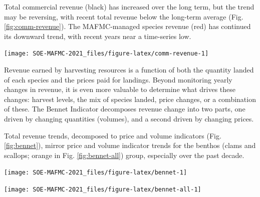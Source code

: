 \documentclass[
  10pt,
]{article}
\let\origfigure\figure
\let\endorigfigure\endfigure
\renewenvironment{figure}[1][2] {
    \expandafter\origfigure\expandafter[H]
} {
    \endorigfigure
}
\begin{document}
Total commercial revenue (black) has increased over the long term, but
the trend may be reversing, with recent total revenue below the
long-term average (Fig. \ref{fig:comm-revenue}). The MAFMC-managed
species revenue (red) has continued its downward trend, with recent
years near a time-series low.

\begin{figure}

{\centering \texttt{[image: SOE-MAFMC-2021\_files/figure-latex/comm-revenue-1]} 

}

\caption{Total revenue for the region (black) and revenue from MAFMC managed species (red).}\label{fig:comm-revenue}
\end{figure}

Revenue earned by harvesting resources is a function of both the
quantity landed of each species and the prices paid for landings. Beyond
monitoring yearly changes in revenue, it is even more valuable to
determine what drives these changes: harvest levels, the mix of species
landed, price changes, or a combination of these. The Bennet Indicator
decomposes revenue change into two parts, one driven by changing
quantities (volumes), and a second driven by changing prices.

Total revenue trends, decomposed to price and volume indicators (Fig.
\ref{fig:bennet}), mirror price and volume indicator trends for the
benthos (clams and scallops; orange in Fig. \ref{fig:bennet-all}) group,
especially over the past decade.

\begin{figure}

{\centering \texttt{[image: SOE-MAFMC-2021\_files/figure-latex/bennet-1]} 

}

\caption{Revenue change from the 2015 values in dollars (black), Price (PI), and Volume Indicators (VI) for commercial landings in the Mid-Atlantic Bight.}\label{fig:bennet}
\end{figure}

\begin{figure}

{\centering \texttt{[image: SOE-MAFMC-2021\_files/figure-latex/bennet-all-1]} 

}

\caption{Total component value in dollars (black) for commercial landings in the Mid-Atlantic Bight.}\label{fig:bennet-all}
\end{figure}
\end{document}
